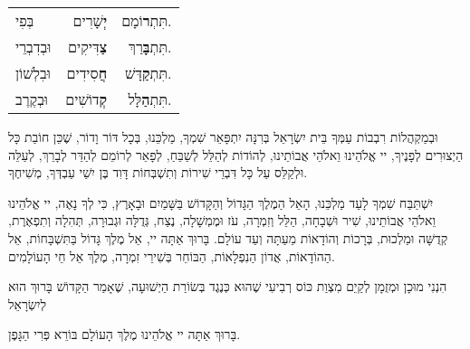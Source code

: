 \begin{center}
\begin{tabular}{l r r}
בְּפִי & {\large \bfseries יְ}שָׁרִים & תִּתְ{\large \bfseries ר}וֹמָם. \\
וּבְדִבְרֵי & {\large \bfseries צַ}דִּיקִים & תִּתְ{\large \bfseries בָּ}רַךְ. \\
וּבִלְשׁוֹן & {\large \bfseries חֲ}סִידִים & תִּתְ{\large \bfseries קַ}דָּשׁ. \\
וּבְקֶרֶב & {\large \bfseries קְ}דוֹשִׁים & תִּתְ{\large \bfseries הַ}לָּל. \\
\end{tabular}
\end{center}

וּבְמַקְהֲלוֹת רִבְבוֹת עַמְּךָ בֵּית יִשְׂרָאֵל בְּרִנָּה יִתְפָּאֵר שִׁמְךָ, מַלְכֵּנוּ, בְּכָל דּוֹר וָדוֹר, שֶׁכֵּן חוֹבַת כָּל הַיְצוּרִים לְפָנֶיךָ, יי אֱלֹהֵינוּ וֵאלֹהֵי אֲבוֹתֵינוּ, לְהוֹדוֹת לְהַלֵּל לְשַׁבֵּחַ, לְפָאֵר לְרוֹמֵם לְהַדֵּר לְבָרֵךְ, לְעַלֵּה וּלְקַלֵּס עַל כָּל דִּבְרֵי שִׁירוֹת וְתִשְׁבְּחוֹת דָּוִד בֶּן יִשַׁי עַבְדְּךָ, מְשִׁיחֶךָ.

\vspace{1em}

יִשְׁתַּבַּח שִׁמְךָ לָעַד מַלְכֵּנוּ, הָאֵל הַמֶלֶךְ הַגָּדוֹל וְהַקָּדוֹשׁ בַּשָּׁמַיִם וּבָאָרֶץ, כִּי לְךָ נָאֶה, יי אֱלֹהֵינוּ וֵאלֹהֵי אֲבוֹתֵינוּ, שִׁיר וּשְׁבָחָה, הַלֵּל וְזִמְרָה, עֹז וּמֶמְשָׁלָה, נֶצַח, גְּדֻלָּה וּגְבוּרָה, תְּהִלָה וְתִפְאֶרֶת, קְדֻשָּׁה וּמַלְכוּת, בְּרָכוֹת וְהוֹדָאוֹת מֵעַתָּה וְעַד עוֹלָם. בָּרוּךְ אַתָּה יי, אֵל מֶלֶךְ גָּדוֹל בַּתִּשְׁבָּחוֹת, אֵל הַהוֹדָאוֹת, אֲדוֹן הַנִפְלָאוֹת, הַבּוֹחֵר בְּשִׁירֵי זִמְרָה, מֶלֶךְ אֵל חֵי הָעוֹלָמִים.

\vspace{1em}



הִנְנִי מוּכָן וּמְזֻמָן לְקַיֵם מִצְוַת כּוֹס רְבִיעִי שֶׁהוּא כְּנֶגֶד בְּשׂוֹרַת הַיְשׁוּעָה, שֶׁאָמַר הַקָּדוֹשׁ בָּרוּךְ הוּא לְיִשְׂרָאֵל 

בָּרוּךְ אַתָּה יי אֱלֹהֵינוּ מֶלֶךְ הָעוֹלָם בּוֹרֵא פְּרִי הַגָּפֶן.



